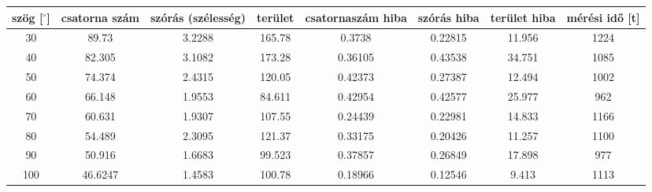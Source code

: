 \begin{center}
\begin{tabular}{|c|c|c|c|c|c|c|c|}
\hline
szög [$^{\circ}$] & csatorna szám & szórás (szélesség) & terület & csatornaszám hiba & szórás hiba & terület hiba & mérési idő [t] \\
\hline
30 & 89.73 & 3.2288 & 165.78 & 0.3738 & 0.22815 & 11.956 & 1224 \\
\hline
40 & 82.305 & 3.1082 & 173.28 & 0.36105 & 0.43538 & 34.751 & 1085 \\
\hline
50 & 74.374 & 2.4315 & 120.05 & 0.42373 & 0.27387 & 12.494 & 1002 \\
\hline
60 & 66.148 & 1.9553 & 84.611 & 0.42954 & 0.42577 & 25.977 & 962 \\
\hline
70 & 60.631 & 1.9307 & 107.55 & 0.24439 & 0.22981 & 14.833 & 1166 \\
\hline
80 & 54.489 & 2.3095 & 121.37 & 0.33175 & 0.20426 & 11.257 & 1100 \\
\hline
90 & 50.916 & 1.6683 & 99.523 & 0.37857 & 0.26849 & 17.898 & 977 \\
\hline
100 & 46.6247 & 1.4583 & 100.78 & 0.18966 & 0.12546 & 9.413 & 1113 \\
\hline
\end{tabular}
\end{center}
